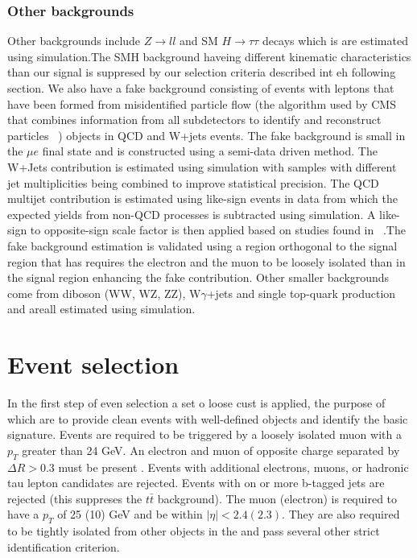 \documentclass[a4paper,11pt]{article}
\begin{document}
\subsubsection{Other backgrounds}
Other backgrounds include $Z\rightarrow ll$  and SM $H\rightarrow \tau\tau$ decays which is are estimated using simulation.The SMH background haveing different kinematic characteristics than our signal is suppresed by our selection criteria described int eh following section. We also have a fake background consisting of events with leptons that have been formed from misidentified particle flow (the algorithm used by CMS that combines information from all subdetectors to identify and reconstruct particles ~\cite{i}) objects in QCD and W+jets events. The fake background is small in the $\mu e$ final state and is constructed using a semi-data driven method. The W+Jets contribution is estimated using simulation with samples with different jet multiplicities being combined to improve statistical precision. The QCD multijet contribution is estimated using like-sign events in data from which the expected yields from non-QCD processes is subtracted using simulation. A like-sign to opposite-sign scale factor is then applied based on studies found in ~\cite{j}.The fake background estimation is validated using a region orthogonal to the signal region that has requires the electron and the muon to be loosely isolated than in the signal region enhancing the fake contribution. Other smaller backgrounds come from diboson (WW, WZ, ZZ), W$\gamma$+jets and single top-quark production and areall estimated using simulation.  


\section {Event selection}
In the first step of even selection a set o loose cust is applied, the purpose of which are to provide clean events with well-defined objects and identify the basic signature. Events are required to be triggered by a loosely isolated muon with a $p_{T}$ greater than 24 GeV. An electron and muon of opposite charge separated by $\Delta R > 0.3$ must be present . Events with additional electrons, muons, or hadronic tau lepton candidates are rejected. Events with on or more b-tagged jets are rejected (this suppreses the $t\bar{t}$ background). The muon (electron) is required to have a $p_{T}$ of 25 (10) GeV and be within $|\eta|<2.4(2.3)$. They are also required to be tightly isolated from other objects in the and pass several other strict identification criterion.\\
\end{document}
